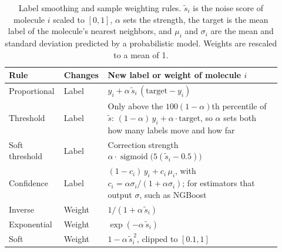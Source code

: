 \begin{table}[htbp]
\centering
\small
\begin{adjustbox}{max width=\textwidth,max totalheight=0.78\textheight}
\begin{tabular}{@{}P{0.17\linewidth}P{0.13\linewidth}P{0.62\linewidth}@{}}
\toprule
Rule & Changes & New label or weight of molecule $i$ \\
\midrule
Proportional & Label & $y_i + \alpha\,\tilde s_i\,(\text{target} - y_i)$ \\
Threshold & Label & Only above the $100(1-\alpha)$th percentile of $\tilde s$: $(1-\alpha)\,y_i + \alpha\cdot\text{target}$, so $\alpha$ sets both how many labels move and how far \\
Soft threshold & Label & Correction strength $\alpha \cdot \operatorname{sigmoid}\!\big(5(\tilde s_i - 0.5)\big)$ \\
Confidence & Label & $(1-c_i)\,y_i + c_i\,\mu_i$, with $c_i = \alpha\sigma_i / (1 + \alpha\sigma_i)$; for estimators that output $\sigma$, such as NGBoost \\
Inverse & Weight & $1 / (1 + \alpha\,\tilde s_i)$ \\
Exponential & Weight & $\exp(-\alpha\,\tilde s_i)$ \\
Soft & Weight & $1 - \alpha\,\tilde s_i^{\,2}$, clipped to $[0.1, 1]$ \\
\bottomrule
\end{tabular}
\end{adjustbox}
\caption[Label smoothing and sample weighting rules.]{Label smoothing and sample weighting rules. $\tilde s_i$ is the noise score of molecule $i$ scaled to $[0, 1]$, $\alpha$ sets the strength, the target is the mean label of the molecule's nearest neighbors, and $\mu_i$ and $\sigma_i$ are the mean and standard deviation predicted by a probabilistic model. Weights are rescaled to a mean of 1.}
\label{tab:noise_corrections}
\end{table}

